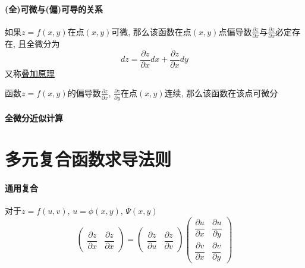 \documentclass[main.tex]{subfiles}
\begin{document}
\paragraph{(全)可微与(偏)可导的关系}
\begin{mthm*}[可微一定可导]
如果$z = f(x, y)$在点$(x, y)$可微, 那么该函数在点$(x, y)$点偏导数$\frac{\partial z}{\partial x}$与$\frac{\partial z}{\partial x}$必定存在,
且全微分为
\begin{equation}
    dz = \frac{\partial z}{\partial x} dx + \frac{\partial z}{\partial x} dy \tag{全微分}
\end{equation}
又称\underline{叠加原理}
\end{mthm*}
\begin{mthm*}[可导不一定可微]
    函数$z = f(x, y)$的偏导数$\frac{\partial z}{\partial x}$, $\frac{\partial z}{\partial y}$在点$(x, y)$连续, 那么该函数在该点可微分
\end{mthm*}
\begin{figure}[ht]
    \centering
\end{figure}
\paragraph{全微分近似计算}
\section{多元复合函数求导法则}
\paragraph{通用复合} 对于$z = f(u, v)$, $u = \phi (x, y)$, $\Psi (x, y)$
\begin{equation}
\begin{pmatrix}
    \dfrac{\partial z}{\partial x} & \dfrac{\partial z}{\partial x}
\end{pmatrix}
=
\begin{pmatrix}
    \dfrac{\partial z}{\partial u} & \dfrac{\partial z}{\partial v}
\end{pmatrix}
\begin{pmatrix}
    \dfrac{\partial u}{\partial x} & \dfrac{\partial u}{\partial y} \\[8pt]
    \dfrac{\partial v}{\partial x} & \dfrac{\partial v}{\partial y}
\end{pmatrix}
\tag{多元复合函数通用求导法则}
\label{多元复合函数通用求导法则}
\end{equation}
\end{document}

